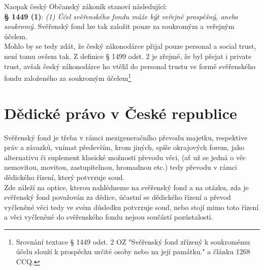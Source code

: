 \documentclass{article}
\begin{document}
Naopak český Občanský zákoník stanoví následující:\\


\textbf{§ 1449 (1)}:
\textit{(1) Účel svěřenského fondu může být veřejně prospěšný, anebo soukromý.} Svěřenský fond lze tak založit pouze za soukromým a veřejným účelem.\\

Mohlo by se tedy zdát, že český zákonodárce přijal pouze personal a social trust, není tomu ovšem tak. Z definice § 1499 odst. 2 je zřejmé, že byl přejat i private trust, avšak český zákonodárce ho vtělil do personal trustu ve formě svěřenského fondu založeného za soukromým účelem\footnote{Srovnání textace § 1449 odst. 2 OZ "Svěřenský fond zřízený k soukromému účelu slouží k prospěchu určité osoby nebo na její památku." a článku 1268 CCQ.}\\


\newpage
\section{Dědické právo v České republice}

Svěřenský fond je třeba v rámci mezigeneračního převodu majetku, respektive práv a závazků, vnímat především, krom jiných, spíše okrajových forem, jako alternativu či suplement klasické možnosti převodu věci, (ať už se jedná o věc nemovitou, movitou, zastupitelnou, hromadnou etc.) tedy převodu v rámci dědického řízení, který potvrzuje soud.\\

Zde záleží na optice, kterou nahlédneme na svěřenský fond a na otázku, zda je svěřenský fond považován za dědice, účastní se dědického řízení a převod vyčleněné věci tedy ve svém důsledku potvrzuje soud, nebo stojí mimo toto řízení a věci vyčleněné do svěřenského fondu nejsou součástí pozůstalosti.\\
\end{document}
